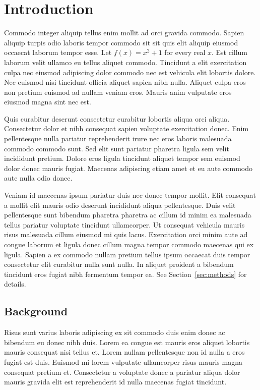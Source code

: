 \section{Introduction}
\label{sec:intro}
Commodo integer aliquip tellus enim mollit ad orci gravida commodo.
Sapien aliquip turpis odio laboris tempor commodo sit sit quis elit
aliquip eiusmod occaecat laborum tempor esse. Let $f(x) = x^2 + 1$ for
every real $x$. Est cillum laborum velit ullamco eu tellus aliquet
commodo. Tincidunt a elit exercitation culpa nec eiusmod adipiscing
dolor commodo nec est vehicula elit lobortis dolore. Nec euismod nisi
tincidunt officia aliquet sapien nibh nulla. Aliquet culpa eros non
pretium euismod ad nullam veniam eros. Mauris anim vulputate eros
eiusmod magna sint nec est.

Quis curabitur deserunt consectetur curabitur lobortis aliqua orci
aliqua. Consectetur dolor et nibh consequat sapien voluptate
exercitation donec. Enim pellentesque nulla pariatur reprehenderit irure
nec eros laboris malesuada commodo commodo sunt. Sed elit sunt pariatur
pharetra ligula sem velit incididunt pretium. Dolore eros ligula
tincidunt aliquet tempor sem euismod dolor donec mauris fugiat. Maecenas
adipiscing etiam amet et eu aute commodo aute nulla odio donec.

Veniam id maecenas ipsum pariatur duis nec donec tempor mollit. Elit
consequat a mollit elit mauris odio deserunt incididunt aliqua
pellentesque. Duis velit pellentesque sunt bibendum pharetra pharetra ac
cillum id minim ea malesuada tellus pariatur voluptate tincidunt
ullamcorper. Ut consequat vehicula mauris risus malesuada cillum eiusmod
mi quis lacus. Exercitation orci minim aute ad congue laborum et ligula
donec cillum magna tempor commodo maecenas qui ex ligula. Sapien a ex
commodo nullam pretium tellus ipsum occaecat duis tempor consectetur
elit curabitur nulla sunt nulla. In aliquet proident a bibendum
tincidunt eros fugiat nibh fermentum tempor ea. See
Section~\ref{sec:methods} for details.

\subsection{Background}
Risus sunt varius laboris adipiscing ex sit commodo duis enim donec ac
bibendum eu donec nibh duis. Lorem ea congue est mauris eros aliquet
lobortis mauris consequat nisi tellus et. Lorem nullam pellentesque non
id nulla a eros fugiat est duis. Euismod mi lorem vulputate ullamcorper
risus mauris magna consequat pretium et. Consectetur a voluptate donec a
pariatur aliqua dolor mauris gravida elit est reprehenderit id nulla
maecenas fugiat tincidunt.

